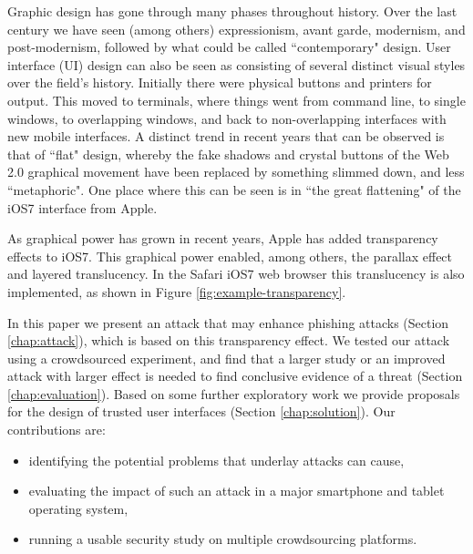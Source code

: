 \documentclass[twoside,letterpaper]{soups}
\begin{document}
Graphic design has gone through many phases throughout history. Over the last century we have seen (among others) expressionism, avant garde, modernism, and post-modernism, followed by what could be called ``contemporary" design. User interface (UI) design can also be seen as consisting of several distinct visual styles over the field's history. Initially there were physical buttons and printers for output. This moved to terminals, where things went from command line, to single windows, to overlapping windows, and back to non-overlapping interfaces with new mobile interfaces. A distinct trend in recent years that can be observed is that of ``flat" design, whereby the fake shadows and crystal buttons of the Web 2.0 graphical movement have been replaced by something slimmed down, and less ``metaphoric". One place where this can be seen is in ``the great flattening" of the iOS7 interface from Apple.

As graphical power has grown in recent years, Apple has added transparency effects to iOS7. This graphical power enabled, among others, the parallax effect and layered translucency. In the Safari iOS7 web browser this translucency is also implemented, as shown in Figure \ref{fig:example-transparency}.


In this paper we present an attack that may enhance phishing attacks (Section \ref{chap:attack}), which is based on this transparency effect. We tested our attack using a crowdsourced experiment, and find that a larger study or an improved attack with larger effect is needed to find conclusive evidence of a threat (Section \ref{chap:evaluation}). Based on some further exploratory work we provide proposals for the design of trusted user interfaces (Section \ref{chap:solution}). Our contributions are:

\begin{itemize}
\item identifying the potential problems that underlay attacks can cause,
\item evaluating the impact of such an attack in a major smartphone and tablet operating system,
\item running a usable security study on multiple crowdsourcing platforms.
\end{itemize}

\end{document}
